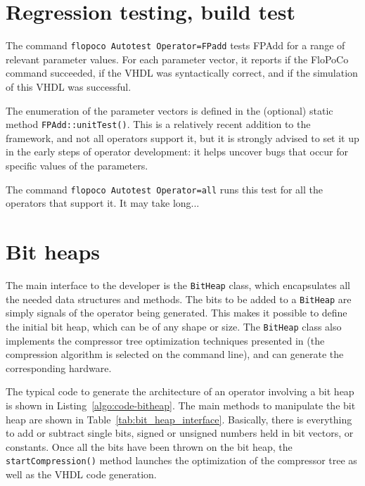 \documentclass{article}
\begin{document}
\section{Regression testing, build test }
The command \verb!flopoco Autotest Operator=FPadd! tests FPAdd for a range of relevant parameter values.
For each parameter vector, it reports if the FloPoCo command succeeded, if the VHDL was syntactically correct, and if the simulation of this VHDL was successful.

The enumeration of the parameter vectors is defined in the (optional) static method \texttt{FPAdd::unitTest()}.
This is a relatively recent addition to the framework, and not all operators support it, but it is strongly advised to set it up in the early steps of operator development: it helps uncover bugs that occur for specific values of the parameters.

The command \verb!flopoco Autotest Operator=all! runs this test for all the operators that support it.
It may take long...

\section{Bit heaps}

The main interface to the developer is the  \texttt{BitHeap} class, which encapsulates all the needed data structures and methods. 
The bits to be added to a \texttt{BitHeap} are simply  signals of the operator being generated.
This makes it possible to define the initial bit heap, which can be of any shape or size. 
The \texttt{BitHeap} class also implements the compressor tree optimization techniques presented in \cite{DinIstSer2013-FPL-BitHeap,kz14a,kz14b,kk18} (the compression algorithm is selected on the command line), and can generate the corresponding hardware.



The typical code to generate the architecture of an operator involving a bit heap is shown in Listing~\ref{algo:code-bitheap}.
The main methods to manipulate the bit heap are shown in Table~\ref{tab:bit_heap_interface}.
Basically, there is everything to add or subtract single bits, signed or unsigned numbers held in bit vectors, or constants. 
Once all the bits have been thrown on the bit heap, the \texttt{startCompression()} method launches the optimization of the compressor tree as well as the VHDL code generation.


\end{document}
